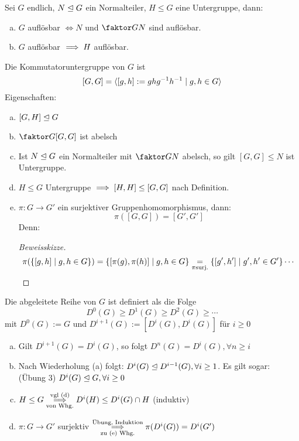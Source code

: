 \documentclass[a4paper]{report}
\begin{document}
\begin{prop}[übung]
  Sei $G$ endlich, $N \trianglelefteq G$ ein Normalteiler, $H \le G$ eine Untergruppe, dann:
  \begin{enumerate}[(a)]
    \item $G$ auflösbar $\iff N$ und $\fak GN$ sind auflösbar.
    \item $G$ auflösbar $\implies H$ auflösbar.
  \end{enumerate}
\begin{whg*}
  Die Kommutatoruntergruppe von $G$ ist
  \[[G,G] = \langle[g, h] := ghg^{-1}h^{-1}\mid g, h \in G\rangle\]
  Eigenschaften:
  \begin{enumerate} [(a)]
    \item $[G, H] \trianglelefteq G$
    \item $\fak G{[G,G]}$ ist abelsch
    \item Ist $N \trianglelefteq G$ ein Normalteiler mit $\fak GN$ abelsch, so gilt $[G, G] \le N$ ist Untergruppe.
    \item $H \le G$ Untergruppe $\implies [H, H] \le [G, G]$ nach Definition.
    \item $\pi : G \to G'$ ein surjektiver Gruppenhomomorphismus, dann: \[\pi([G, G]) = [G', G']\]
          Denn: \begin{proof}[Beweisskizze]
           \[\pi(\{[g, h] \mid g, h \in G\}) = \{[\pi(g), \pi(h)] \mid g, h \in G\} \underset{\pi \text{surj.}} = \{[g', h'] \mid g', h' \in G'\} \cdots \qedhere\]
          \end{proof}
  \end{enumerate}
\end{whg*}
\end{prop}
\begin{defi}
  Die abgeleitete Reihe von $G$ ist definiert als die Folge \[D^{0}(G) \ge D^{1}(G) \ge D^{2}(G) \ge \cdots\]
  mit $D^{0}(G) := G$ und $D^{i+1}(G) := [D^{i}(G), D^{i}(G)]$ für $i \ge 0$
\end{defi}
\begin{bem}\item
\begin{enumerate}[(a)]
  \item Gilt $D^{i+1}(G) = D^{i}(G)$, so folgt $D^{n}(G) = D^{i}(G), \forall n \ge i$
  \item Nach Wiederholung (a) folgt: $D^{i}(G) \trianglelefteq D^{i-1}(G), \forall i \ge 1$. Es gilt sogar: (Übung 3) $D^{i}(G) \trianglelefteq G, \forall i \ge 0$
  \item $H \le G \overunderset{\text{vgl (d)}}{\text{von Whg.}}\imp D^{i}(H) \le D^{i}(G) \cap H$ (induktiv)
    \item $\pi: G \to G'$ surjektiv $\overunderset{\text{Übung, Induktion}}{\text{zu (e) Whg.}} \imp  \pi(D^{i}(G)) = D^{i}(G')$
\end{enumerate}
\end{bem}
\end{document}
